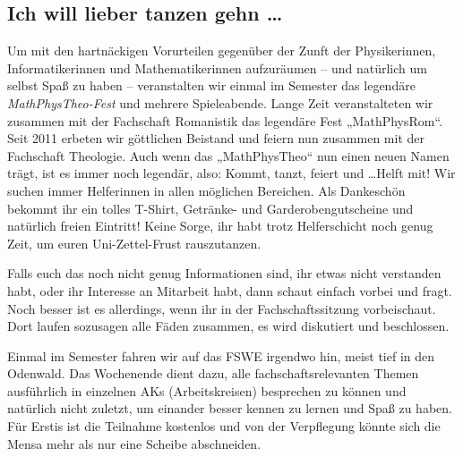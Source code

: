 \subsection{Ich will lieber tanzen gehn \dots}
Um mit den hartnäckigen Vorurteilen gegenüber der Zunft der Physikerinnen, Informatikerinnen und Mathematikerinnen aufzuräumen -- und natürlich um selbst Spaß zu haben -- veranstalten wir einmal im Semester das legendäre \emph{MathPhysTheo-Fest} und mehrere Spieleabende. Lange Zeit veranstalteten wir zusammen mit der Fachschaft Romanistik das legendäre Fest „MathPhysRom“. Seit 2011 erbeten wir göttlichen Beistand und feiern nun zusammen mit der Fachschaft Theologie. Auch wenn das „MathPhysTheo“ nun einen neuen Namen trägt, ist es immer noch legendär, also: Kommt, tanzt, feiert und \dots Helft mit! Wir suchen immer Helferinnen in allen möglichen Bereichen. Als Dankeschön bekommt ihr ein tolles T-Shirt, Getränke- und Garderobengutscheine und natürlich freien Eintritt! Keine Sorge, ihr habt trotz Helferschicht noch genug Zeit, um euren Uni-Zettel-Frust rauszutanzen.


Falls euch das noch nicht genug Informationen sind, ihr etwas nicht verstanden habt, oder ihr Interesse an Mitarbeit habt, dann schaut einfach vorbei und fragt. Noch besser ist es allerdings, wenn ihr in der Fachschaftssitzung vorbeischaut. Dort laufen sozusagen alle Fäden zusammen, es wird diskutiert und beschlossen.

Einmal im Semester fahren wir auf das \gls{FSWE} irgendwo hin, meist tief in den Odenwald. Das Wochenende dient dazu, alle fachschaftsrelevanten Themen ausführlich in einzelnen AKs (Arbeitskreisen) besprechen zu können und natürlich nicht zuletzt, um einander besser kennen zu lernen und Spaß zu haben. Für Erstis ist die Teilnahme kostenlos und von der Verpflegung könnte sich die Mensa mehr als nur eine Scheibe abschneiden.
